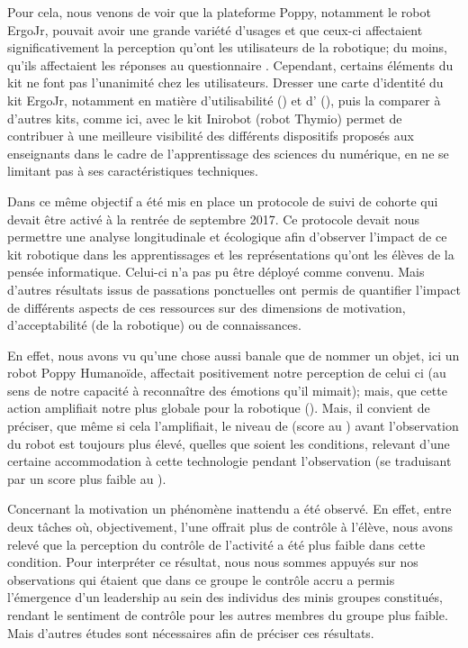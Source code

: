 Pour cela, nous venons de voir que la plateforme Poppy, notamment le robot ErgoJr, pouvait avoir une grande variété d'usages et que ceux-ci affectaient significativement la perception qu'ont les utilisateurs de la robotique; du moins, qu'ils affectaient les réponses au questionnaire .
Cependant, certains éléments du kit  ne font pas l'unanimité chez les utilisateurs. Dresser une carte d'identité du kit ErgoJr, notamment en matière d'utilisabilité (\cf {}) et d' (\cf {}), puis la comparer à d'autres kits, comme ici, avec le kit Inirobot (\ie robot Thymio) permet de contribuer à une meilleure visibilité des différents dispositifs proposés aux enseignants dans le cadre de l'apprentissage des sciences du numérique, en ne se limitant pas à ses caractéristiques techniques.\par%
Dans ce même objectif a été mis en place un protocole de suivi de cohorte qui devait être activé à la rentrée de septembre 2017. Ce protocole devait nous permettre une analyse longitudinale et écologique afin d'observer l'impact de ce kit robotique dans les apprentissages et les représentations qu'ont les élèves de la pensée informatique. Celui-ci n'a pas pu être déployé comme convenu. Mais d'autres résultats issus de passations ponctuelles ont permis de quantifier l'impact de différents aspects de ces ressources sur des dimensions de motivation, d'acceptabilité (de la robotique) ou de connaissances.\par%
En effet, nous avons vu qu'une chose aussi banale que de nommer un objet, ici un robot Poppy Humanoïde, affectait positivement notre perception de celui ci (au sens de notre capacité à reconnaître des émotions qu'il mimait); mais, que cette action amplifiait notre  plus globale pour la robotique (\cf {}). Mais, il convient de préciser, que même si cela l'amplifiait, le niveau de  (score au ) avant l'observation du robot est toujours plus élevé, quelles que soient les conditions, relevant d'une certaine accommodation à cette technologie pendant l'observation (se traduisant par un score plus faible au ).\par%
Concernant la motivation un phénomène inattendu a été observé. En effet, entre deux tâches où, objectivement, l'une offrait plus de contrôle à l'élève, nous avons relevé  que la perception du contrôle de l'activité a été plus faible dans cette condition. Pour interpréter ce résultat, nous nous sommes appuyés sur nos observations qui étaient que dans ce groupe le contrôle accru a permis l'émergence d’un leadership au sein des individus des minis groupes constitués, rendant le sentiment de contrôle pour les autres membres du groupe plus faible. Mais d'autres études sont nécessaires afin de préciser ces résultats.\par%
